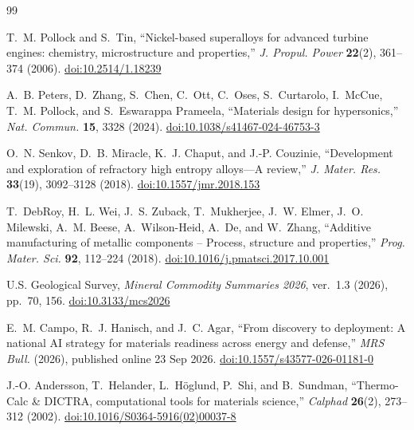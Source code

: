 \documentclass[12pt,letterpaper]{article}
\begin{document}
\clearpage
\setcounter{page}{1}
\renewcommand{\thepage}{R\arabic{page}}  %
\begin{thebibliography}{99}
\setlength{\itemsep}{2pt}

T.~M. Pollock and S.~Tin, ``Nickel-based superalloys for advanced turbine
engines: chemistry, microstructure and properties,'' \emph{J. Propul. Power}
\textbf{22}(2), 361--374 (2006).
\href{https://doi.org/10.2514/1.18239}{doi:10.2514/1.18239}

A.~B. Peters, D.~Zhang, S.~Chen, C.~Ott, C.~Oses, S.~Curtarolo, I.~McCue,
T.~M. Pollock, and S.~Eswarappa Prameela, ``Materials design for hypersonics,''
\emph{Nat. Commun.} \textbf{15}, 3328 (2024).
\href{https://doi.org/10.1038/s41467-024-46753-3}{doi:10.1038/s41467-024-46753-3}

O.~N. Senkov, D.~B. Miracle, K.~J. Chaput, and J.-P. Couzinie, ``Development
and exploration of refractory high entropy alloys---A review,''
\emph{J. Mater. Res.} \textbf{33}(19), 3092--3128 (2018).
\href{https://doi.org/10.1557/jmr.2018.153}{doi:10.1557/jmr.2018.153}

T.~DebRoy, H.~L. Wei, J.~S. Zuback, T.~Mukherjee, J.~W. Elmer,
J.~O. Milewski, A.~M. Beese, A.~Wilson-Heid, A.~De, and W.~Zhang, ``Additive
manufacturing of metallic components -- Process, structure and properties,''
\emph{Prog. Mater. Sci.} \textbf{92}, 112--224 (2018).
\href{https://doi.org/10.1016/j.pmatsci.2017.10.001}{doi:10.1016/j.pmatsci.2017.10.001}

U.S. Geological Survey, \emph{Mineral Commodity Summaries 2026}, ver.~1.3
(2026), pp.~70, 156.
\href{https://doi.org/10.3133/mcs2026}{doi:10.3133/mcs2026}

E.~M. Campo, R.~J. Hanisch, and J.~C. Agar, ``From discovery to deployment:
A national AI strategy for materials readiness across energy and defense,''
\emph{MRS Bull.} (2026), published online 23 Sep 2026.
\href{https://doi.org/10.1557/s43577-026-01181-0}{doi:10.1557/s43577-026-01181-0}

J.-O. Andersson, T.~Helander, L.~H{\"o}glund, P.~Shi, and B.~Sundman,
``Thermo-Calc \& DICTRA, computational tools for materials science,''
\emph{Calphad} \textbf{26}(2), 273--312 (2002).
\href{https://doi.org/10.1016/S0364-5916(02)00037-8}{doi:10.1016/S0364-5916(02)00037-8}


\end{thebibliography}
\end{document}
